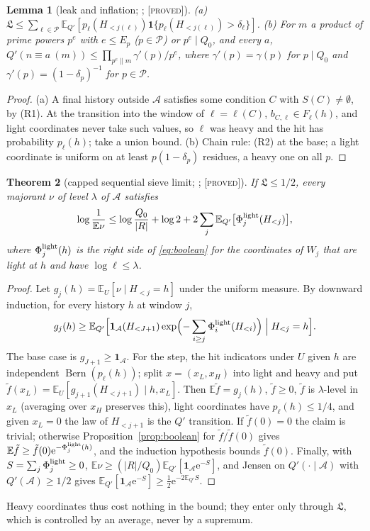 \documentclass[10pt,reqno]{amsart}
\newtheorem{theorem}{Theorem}[section]
\newtheorem{lemma}[theorem]{Lemma}
\theoremstyle{definition}
\theoremstyle{remark}
\newcommand{\A}{\mathcal A}
\newcommand{\cP}{\mathcal P}
\newcommand{\E}{\mathbb E}
\newcommand{\ind}{\mathbf 1}
\newcommand{\Bern}{\operatorname{Bern}}
\newcommand{\e}{\mathrm e}
\newcommand{\lab}[1]{\textup{[\textsc{#1}]}}
\begin{document}
\begin{lemma}[leak and inflation; {\cite[Lemmas~2.1, 2.2]{TW}}; \lab{proved}]\label{lem:leak}
(a) $\mathfrak L\leq\sum_{\ell\in\cP}\E_{Q'}[p_\ell(H_{<j(\ell)})\ind\{p_\ell(H_{<j(\ell)})>\delta_\ell\}]$.
(b) For $m$ a product of prime powers $p^e$ with $e\leq E_p$ ($p\in\cP$) or
$p^e\mid Q_0$, and every $a$,
$Q'(n\equiv a\ (m))\leq\prod_{p^e\| m}\gamma'(p)/p^e$, where
$\gamma'(p)=\gamma(p)$ for $p\mid Q_0$ and $\gamma'(p)=(1-\delta_p)^{-1}$ for
$p\in\cP$.
\end{lemma}
\begin{proof}
(a) A final history outside $\A$ satisfies some condition $C$ with
$S(C)\neq\emptyset$, by (R1).  At the transition into the window of
$\ell=\ell(C)$, $b_{C,\ell}\in F_\ell(h)$, and light coordinates never take
such values, so $\ell$ was heavy and the hit has probability $p_\ell(h)$;
take a union bound.  (b) Chain rule: (R2) at the base; a light coordinate
is uniform on at least $p(1-\delta_p)$ residues, a heavy one on all $p$.
\end{proof}

\begin{theorem}[capped sequential sieve limit; {\cite[Thm~2.3]{TW}}; \lab{proved}]\label{thm:capped}
If $\mathfrak L\leq1/2$, every majorant $\nu$ of level $\lambda$ of $\A$
satisfies
\[
 \log\frac1{\E\nu}\leq\log\frac{Q_0}{|R|}+\log2+2\sum_j\E_{Q'}\bigl[\Phi_j^{\rm light}(H_{<j})\bigr],
\]
where $\Phi_j^{\rm light}(h)$ is the right side of \eqref{eq:boolean} for the
coordinates of $W_j$ that are light at $h$ and have $\log\ell\leq\lambda$.
\end{theorem}
\begin{proof}
Let $g_j(h)=\E_U[\nu\mid H_{<j}=h]$ under the uniform measure.  By downward
induction, for every history $h$ at window $j$,
\[
 g_j(h)\geq\E_{Q'}\Bigl[\ind_\A(H_{<J+1})\exp\Bigl(-\sum_{i\geq j}\Phi_i^{\rm light}(H_{<i})\Bigr)\Bigm| H_{<j}=h\Bigr].
\]
The base case is $g_{J+1}\geq\ind_\A$.  For the step, the hit indicators
under $U$ given $h$ are independent $\Bern(p_\ell(h))$; split
$x=(x_L,x_H)$ into light and heavy and put
$\tilde f(x_L)=\E_U[g_{j+1}(H_{<j+1})\mid h,x_L]$.  Then $\E\tilde f=g_j(h)$,
$\tilde f\geq0$, $\tilde f$ is $\lambda$-level in $x_L$ (averaging over $x_H$
preserves this), light coordinates have $p_\ell(h)\leq1/4$, and given
$x_L=0$ the law of $H_{<j+1}$ is the $Q'$ transition.  If $\tilde f(0)=0$ the
claim is trivial; otherwise Proposition~\ref{prop:boolean} for
$\tilde f/\tilde f(0)$ gives $\E\tilde f\geq\tilde f(0)\e^{-\Phi_j^{\rm light}(h)}$,
and the induction hypothesis bounds $\tilde f(0)$.  Finally, with
$S=\sum_j\Phi^{\rm light}_j\geq0$,
$\E\nu\geq(|R|/Q_0)\E_{Q'}[\ind_\A\e^{-S}]$, and Jensen on $Q'(\cdot\mid\A)$
with $Q'(\A)\geq1/2$ gives $\E_{Q'}[\ind_\A\e^{-S}]\geq\frac12\e^{-2\E_{Q'}S}$.
\end{proof}
Heavy coordinates thus cost nothing in the bound; they enter only through
$\mathfrak L$, which is controlled by an average, never by a supremum.
\end{document}
